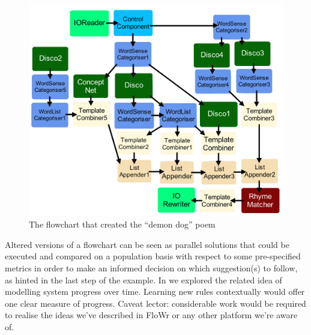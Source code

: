 \begin{figure}[t]
\begin{center}
\includegraphics[width=\columnwidth]{./figures/PoemsFlowchart.png}
\caption{The flowchart that created the ``demon dog'' poem}
\label{poetryGeneratorFlowchart}
\end{center}
\end{figure}

Altered versions of a flowchart \cite{charnley2014flowr} can be seen as parallel solutions that could be executed and compared on a population basis with respect to some pre-specified metrics in order to make an informed decision on which suggestion(s) to follow, as hinted in the last step of the example.  In \cite{colton-assessingprogress} we explored the related idea of modelling system progress over time.  Learning new rules contextually would offer one clear measure of progress.  Caveat lector: considerable work would be required to realise the ideas we've described in FloWr or any other platform we're aware of.
